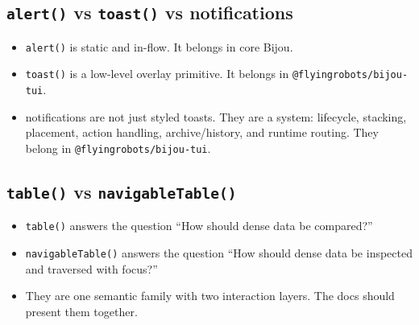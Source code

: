\subsection{\texorpdfstring{\texttt{a\allowbreak{}l\allowbreak{}e\allowbreak{}r\allowbreak{}t\allowbreak{}(\allowbreak{})} vs \texttt{t\allowbreak{}o\allowbreak{}a\allowbreak{}s\allowbreak{}t\allowbreak{}(\allowbreak{})} vs notifications}{ vs  vs notifications}}\label{record-425-alert-vs-toast-vs-notifications}

\begin{itemize}
\tightlist
\item
  \texttt{a\allowbreak{}l\allowbreak{}e\allowbreak{}r\allowbreak{}t\allowbreak{}(\allowbreak{})} is static and in-flow. It belongs in core Bijou.
\item
  \texttt{t\allowbreak{}o\allowbreak{}a\allowbreak{}s\allowbreak{}t\allowbreak{}(\allowbreak{})} is a low-level overlay primitive. It belongs in \texttt{@\allowbreak{}f\allowbreak{}l\allowbreak{}y\allowbreak{}i\allowbreak{}n\allowbreak{}g\allowbreak{}r\allowbreak{}o\allowbreak{}b\allowbreak{}o\allowbreak{}t\allowbreak{}s\allowbreak{}/\allowbreak{}b\allowbreak{}i\allowbreak{}j\allowbreak{}o\allowbreak{}u\allowbreak{}-\allowbreak{}t\allowbreak{}u\allowbreak{}i}.
\item
  notifications are not just styled toasts. They are a system: lifecycle, stacking, placement, action handling, archive/history, and runtime routing. They belong in \texttt{@\allowbreak{}f\allowbreak{}l\allowbreak{}y\allowbreak{}i\allowbreak{}n\allowbreak{}g\allowbreak{}r\allowbreak{}o\allowbreak{}b\allowbreak{}o\allowbreak{}t\allowbreak{}s\allowbreak{}/\allowbreak{}b\allowbreak{}i\allowbreak{}j\allowbreak{}o\allowbreak{}u\allowbreak{}-\allowbreak{}t\allowbreak{}u\allowbreak{}i}.
\end{itemize}

\subsection{\texorpdfstring{\texttt{t\allowbreak{}a\allowbreak{}b\allowbreak{}l\allowbreak{}e\allowbreak{}(\allowbreak{})} vs \texttt{n\allowbreak{}a\allowbreak{}v\allowbreak{}i\allowbreak{}g\allowbreak{}a\allowbreak{}b\allowbreak{}l\allowbreak{}e\allowbreak{}T\allowbreak{}a\allowbreak{}b\allowbreak{}l\allowbreak{}e\allowbreak{}(\allowbreak{})}}{ vs }}\label{record-425-table-vs-navigabletable}

\begin{itemize}
\tightlist
\item
  \texttt{t\allowbreak{}a\allowbreak{}b\allowbreak{}l\allowbreak{}e\allowbreak{}(\allowbreak{})} answers the question ``How should dense data be compared?''
\item
  \texttt{n\allowbreak{}a\allowbreak{}v\allowbreak{}i\allowbreak{}g\allowbreak{}a\allowbreak{}b\allowbreak{}l\allowbreak{}e\allowbreak{}T\allowbreak{}a\allowbreak{}b\allowbreak{}l\allowbreak{}e\allowbreak{}(\allowbreak{})} answers the question ``How should dense data be inspected and traversed with focus?''
\item
  They are one semantic family with two interaction layers. The docs should present them together.
\end{itemize}

